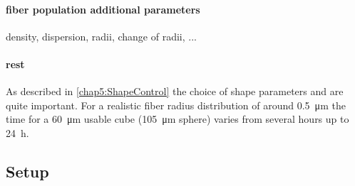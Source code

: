 \paragraph{fiber population additional parameters}
density, dispersion, radii, change of radii, ...
% 
% 

\paragraph{rest}
% 
As described in \cref{chap5:ShapeControl} the choice of shape parameters \segLength and \segRadius are quite important. For a realistic fiber radius distribution of around \SI{0.5}{\micro\meter} the time for a \SI{60}{\micro\meter} usable cube (\SI{105}{\micro\meter} sphere) varies from several hours up to \SI{24}{\hour}.
% 
% 
\subsection{Setup}
% 

